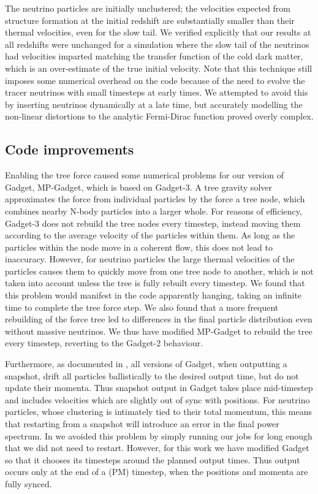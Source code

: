 \documentclass[useAMS, usenatbib]{mnras}
\begin{document}
The neutrino particles are initially unclustered; the velocities expected from structure formation at the initial redshift are substantially smaller than their thermal velocities, even for the slow tail. We verified explicitly that our results at all redshifts were unchanged for a simulation where the slow tail of the neutrinos had velocities imparted matching the transfer function of the cold dark matter, which is an over-estimate of the true initial velocity.
Note that this technique still imposes some numerical overhead on the code because of the need to evolve the tracer neutrinos with small timesteps at early times. We attempted to avoid this by inserting neutrinos dynamically at a late time, but accurately modelling the non-linear distortions to the analytic Fermi-Dirac function proved overly complex.

\subsection{Code improvements}
\label{sec:code}

Enabling the tree force caused some numerical problems for our version of Gadget, MP-Gadget, which is based on Gadget-3.
A tree gravity solver approximates the force from individual particles by the force a tree node, which combines nearby N-body particles into a larger whole. For reasons of efficiency, Gadget-3 does not rebuild the tree nodes every timestep, instead moving them according to the average velocity of the particles within them. As long as the particles within the node move in a coherent flow, this does not lead to inaccuracy. However, for neutrino particles the large thermal velocities of the particles causes them to quickly move from one tree node to another, which is not taken into account unless the tree is fully rebuilt every timestep. We found that this problem would manifest in the code apparently hanging, taking an infinite time to complete the tree force step. We also found that a more frequent rebuilding of the force tree led to differences in the final particle distribution even without massive neutrinos. We thus have modified MP-Gadget to rebuild the tree every timestep, reverting to the Gadget-2 behaviour.

Furthermore, as documented in \cite{Springel_2005}, all versions of Gadget, when outputting a snapshot, drift all particles ballistically to the desired output time, but do not update their momenta. Thus snapshot output in Gadget takes place mid-timestep and includes velocities which are slightly out of sync with positions. For neutrino particles, whose clustering is intimately tied to their total momentum, this means that restarting from a snapshot will introduce an error in the final power spectrum. In \cite{AHB} we avoided this problem by simply running our jobs for long enough that we did not need to restart. However, for this work we have modified Gadget so that it chooses its timesteps around the planned output times. Thus output occurs only at the end of a (PM) timestep, when the positions and momenta are fully synced.
\end{document}
